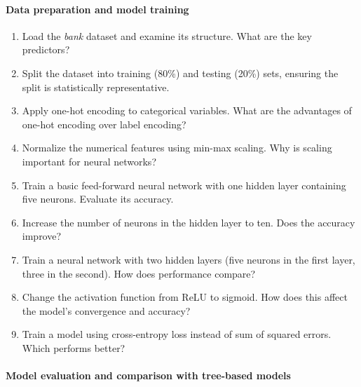 \documentclass[
  11pt,
]{book}
\providecommand{\tightlist}{%
  \setlength{\itemsep}{0pt}\setlength{\parskip}{0pt}}
\theoremstyle{definition}
\theoremstyle{definition}
\theoremstyle{definition}
\theoremstyle{definition}
\theoremstyle{remark}
\begin{document}
\paragraph*{Data preparation and model training}\label{data-preparation-and-model-training}

\begin{enumerate}
\def\labelenumi{\arabic{enumi}.}
\setcounter{enumi}{14}
\tightlist
\item
  Load the \emph{bank} dataset and examine its structure. What are the key predictors?
\item
  Split the dataset into training (80\%) and testing (20\%) sets, ensuring the split is statistically representative.
\item
  Apply one-hot encoding to categorical variables. What are the advantages of one-hot encoding over label encoding?
\item
  Normalize the numerical features using min-max scaling. Why is scaling important for neural networks?
\item
  Train a basic feed-forward neural network with one hidden layer containing five neurons. Evaluate its accuracy.
\item
  Increase the number of neurons in the hidden layer to ten. Does the accuracy improve?
\item
  Train a neural network with two hidden layers (five neurons in the first layer, three in the second). How does performance compare?
\item
  Change the activation function from ReLU to sigmoid. How does this affect the model's convergence and accuracy?
\item
  Train a model using cross-entropy loss instead of sum of squared errors. Which performs better?
\end{enumerate}

\paragraph*{Model evaluation and comparison with tree-based models}\label{model-evaluation-and-comparison-with-tree-based-models}
\end{document}
